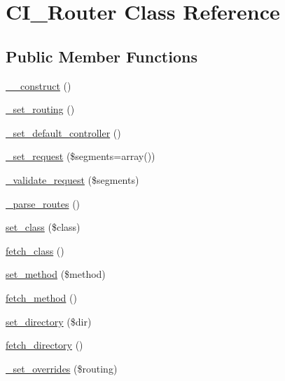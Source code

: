 \hypertarget{class_c_i___router}{\section{C\-I\-\_\-\-Router Class Reference}
\label{class_c_i___router}
}
\subsection*{Public Member Functions}
\begin{DoxyCompactItemize}
\item 
\hyperlink{class_c_i___router_a095c5d389db211932136b53f25f39685}{\-\_\-\-\_\-construct} ()
\item 
\hyperlink{class_c_i___router_abc9f3e0d48cec66f93a7f103c9a65892}{\-\_\-set\-\_\-routing} ()
\item 
\hyperlink{class_c_i___router_a86b13067b062022251d2c7ecb4fb9492}{\-\_\-set\-\_\-default\-\_\-controller} ()
\item 
\hyperlink{class_c_i___router_a92b8b486926e4dea5fee4d71f80a472a}{\-\_\-set\-\_\-request} (\$segments=array())
\item 
\hyperlink{class_c_i___router_a488aa4aaa52c36c4e6c791e7bfd76358}{\-\_\-validate\-\_\-request} (\$segments)
\item 
\hyperlink{class_c_i___router_a55a42fae865d03334b49baa5a5a6bd0b}{\-\_\-parse\-\_\-routes} ()
\item 
\hyperlink{class_c_i___router_afbb540df5c161fe69909a5f8182f910f}{set\-\_\-class} (\$class)
\item 
\hyperlink{class_c_i___router_af5586c3f514021e9e2588e102620d237}{fetch\-\_\-class} ()
\item 
\hyperlink{class_c_i___router_a6a42036a115946acdaf0975c994106fb}{set\-\_\-method} (\$method)
\item 
\hyperlink{class_c_i___router_ad408b28e3a095e7435f21e95d93e7714}{fetch\-\_\-method} ()
\item 
\hyperlink{class_c_i___router_aba98bd014f2bd0e2b299bd7a0695b33e}{set\-\_\-directory} (\$dir)
\item 
\hyperlink{class_c_i___router_a7a089f2cfae731dcc9e59a71d20208ef}{fetch\-\_\-directory} ()
\item 
\hyperlink{class_c_i___router_a43442c6087205cb04125a4953b045d87}{\-\_\-set\-\_\-overrides} (\$routing)
\end{DoxyCompactItemize}
